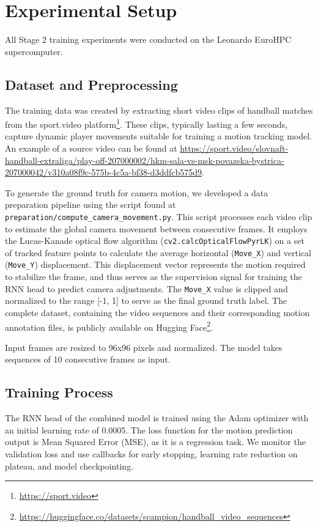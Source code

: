 \documentclass{article}
\begin{document}
\section{Experimental Setup}
All Stage 2 training experiments were conducted on the Leonardo EuroHPC supercomputer.

\subsection{Dataset and Preprocessing}
The training data was created by extracting short video clips of handball matches from the sport.video platform\footnote{\url{https://sport.video}}. These clips, typically lasting a few seconds, capture dynamic player movements suitable for training a motion tracking model. An example of a source video can be found at \url{https://sport.video/slovnaft-handball-extraliga/play-off-207000002/hkm-sala-vs-msk-povazska-bystrica-207000042/v310a08f9c-575b-4c5a-bf38-d3ddfcb575d9}.

To generate the ground truth for camera motion, we developed a data preparation pipeline using the script found at \texttt{preparation/compute\_camera\_movement.py}. This script processes each video clip to estimate the global camera movement between consecutive frames. It employs the Lucas-Kanade optical flow algorithm (\texttt{cv2.calcOpticalFlowPyrLK}) on a set of tracked feature points to calculate the average horizontal (\texttt{Move\_X}) and vertical (\texttt{Move\_Y}) displacement. This displacement vector represents the motion required to stabilize the frame, and thus serves as the supervision signal for training the RNN head to predict camera adjustments. The \texttt{Move\_X} value is clipped and normalized to the range [-1, 1] to serve as the final ground truth label. The complete dataset, containing the video sequences and their corresponding motion annotation files, is publicly available on Hugging Face\footnote{\url{https://huggingface.co/datasets/scampion/handball_video_sequences}}.

Input frames are resized to 96x96 pixels and normalized. The model takes sequences of 10 consecutive frames as input.

\subsection{Training Process}
The RNN head of the combined model is trained using the Adam optimizer with an initial learning rate of 0.0005. The loss function for the motion prediction output is Mean Squared Error (MSE), as it is a regression task. We monitor the validation loss and use callbacks for early stopping, learning rate reduction on plateau, and model checkpointing.
\end{document}
